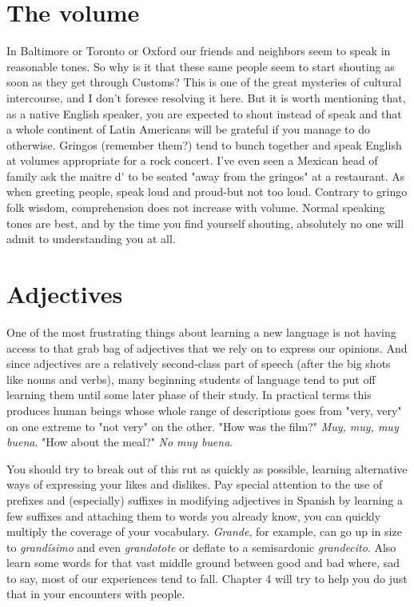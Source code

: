 \documentclass[14pt,a4paper,oneside]{memoir}
\begin{document}
\section{The volume}

In Baltimore or Toronto or Oxford our friends and neighbors
seem to speak in reasonable tones. So why is it that these same people
seem to start shouting as soon as they get through Customs? This is
one of the great mysteries of cultural intercourse, and I don't foresee
resolving it here. But it is worth mentioning that, as a native English
speaker, you are expected to shout instead of speak and that a whole
continent of Latin Americans will be grateful if you manage to do otherwise. Gringos (remember them?) tend to bunch together and speak
English at volumes appropriate for a rock concert. I've even seen a
Mexican head of family ask the maitre d' to be seated "away from the
gringos" at a restaurant. As when greeting people, speak loud and
proud-but not too loud. Contrary to gringo folk wisdom, comprehension does not increase with volume. Normal speaking tones are best,
and by the time you find yourself shouting, absolutely no one will admit to understanding you at all.

\section{Adjectives}

One of the most frustrating things about learning a new language is not having access to that grab bag of adjectives that we rely on
to express our opinions. And since adjectives are a relatively second-class part of speech (after the big shots like nouns and verbs), many
beginning students of language tend to put off learning them until
some later phase of their study. In practical terms this produces human
beings whose whole range of descriptions goes from "very, very" on
one extreme to "not very" on the other. "How was the film?" \emph{Muy,
muy, muy buena}. "How about the meal?" \emph{No muy buena}.

You should try to break out of this rut as quickly as possible,
learning alternative ways of expressing your likes and dislikes. Pay special attention to the use of prefixes and (especially) suffixes in modifying adjectives in Spanish by learning a few suffixes and attaching
them to words you already know, you can quickly multiply the coverage of your vocabulary. \emph{Grande}, for example, can go up in size to \emph{grandísimo} and even \emph{grandotote} or deflate to a semisardonic \emph{grandecito}.
Also learn some words for that vast middle ground between good and
bad where, sad to say, most of our experiences tend to fall. Chapter 4
will try to help you do just that in your encounters with people.
\end{document}
